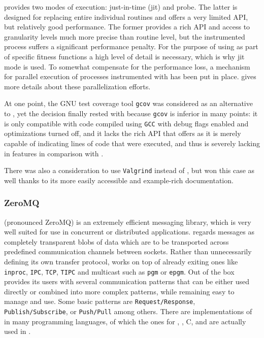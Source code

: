 \pin provides two modes of execution: just-in-time (jit) and probe. The latter is designed for replacing
entire individual routines and offers a very limited API, but relatively good performance. The former provides
a rich API and access to granularity levels much more precise than routine level, but the instrumented process
suffers a significant performance penalty. For the purpose of using \pin as part of specific fitness functions
a high level of detail is necessary, which is why jit mode is used. To somewhat compensate for the performance
loss, a mechanism for parallel execution of processes instrumented with \pin has been put in place.
 gives more details about these parallelization efforts.

At one point, the GNU test coverage tool \texttt{gcov}\cite{gcov} was considered as an alternative to 
\pin, yet the decision finally rested with \pin because \texttt{gcov} is inferior in many points: it is only
compatible with code compiled using \texttt{GCC} with debug flags enabled and optimizations turned off,
and it lacks the rich API that \pin offers as it is merely capable of indicating lines of code that were executed, and
thus is severely lacking in features in comparison with \pin.

There was also a consideration to use \texttt{Valgrind}\cite{Nethercote03valgrind:a} instead of \pin, but \pin
won this case as well thanks to its more easily accessible and example-rich documentation. 
\tocless\subsubsection{ZeroMQ}
\label{sec:zmq}
\zmq{}\cite{zmq} (pronounced {\small ZeroMQ}) is an extremely efficient messaging library, 
which is very well suited for use in concurrent or distributed applications. \zmq regards messages as 
completely transparent blobs of data which are to be transported across predefined communication channels 
between sockets. Rather than unnecessarily defining its own transfer protocol, \zmq works on top of already exiting 
ones like \texttt{inproc}, \texttt{IPC}, \texttt{TCP}, \texttt{TIPC} and multicast such as \texttt{pgm} or \texttt{epgm}.
Out of the box \zmq provides its users with several communication patterns that can be either used directly or combined 
into more complex patterns, while remaining easy to manage and use. Some basic patterns are
\texttt{Request/Response}, \texttt{Publish/Subscribe}, or \texttt{Push/Pull} among others.
There are implementations of \zmq in many programming languages, of which the ones for \java, \python, {\small C}, 
and \cpp are actually used in \xmlmate. 

